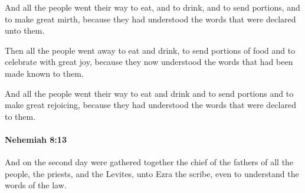 			\begin{versebox}
					\item[BHS] 
					\item[LXX] 
					\item[ASV] And all the people went their way to eat, and to drink, and to send portions, and to make great mirth, because they had understood the words that were declared unto them.
					\item[NIV] Then all the people went away to eat and drink, to send portions of food and to celebrate with great joy, because they now understood the words that had been made known to them.
					\item[NRSV] And all the people went their way to eat and drink and to send portions and to make great rejoicing, because they had understood the words that were declared to them.
			\end{versebox}

		\paragraph{Nehemiah 8:13} %
			\label{NEHEMIAH-8-13}

			And on the second day were gathered together the chief of the fathers of all the people, the priests, and the Levites, unto Ezra the scribe, even to understand the words of the law.

